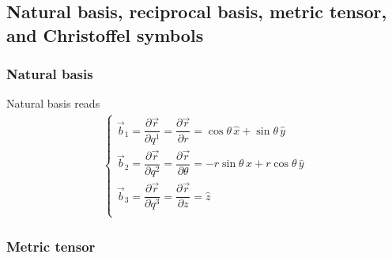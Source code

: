 \documentclass[letterpaper,10pt,english]{jupyterBook}
\begin{document}
\subsection{Natural basis, reciprocal basis, metric tensor, and Christoffel symbols}
\label{\detokenize{ch/tensor-algebra-calculus/calculus-euclidean-cylindrical:natural-basis-reciprocal-basis-metric-tensor-and-christoffel-symbols}}\label{\detokenize{ch/tensor-algebra-calculus/calculus-euclidean-cylindrical:tensor-calculus-cylindrical-metric}}\subsubsection*{Natural basis}

\sphinxAtStartPar
Natural basis reads
\begin{equation*}
\begin{split}\begin{cases}
\vec{b}_1 = \dfrac{\partial \vec{r}}{\partial q^1} = \dfrac{\partial \vec{r}}{\partial r     } = \cos \theta \, \hat{x} + \sin \theta \, \hat{y} \\
\vec{b}_2 = \dfrac{\partial \vec{r}}{\partial q^2} = \dfrac{\partial \vec{r}}{\partial \theta} = - r \sin \theta \, \hat{x} + r \cos \theta \, \hat{y} \\
\vec{b}_3 = \dfrac{\partial \vec{r}}{\partial q^3} = \dfrac{\partial \vec{r}}{\partial z     } = \hat{z} \\
\end{cases}\end{split}
\end{equation*}\subsubsection*{Metric tensor}
\end{document}

